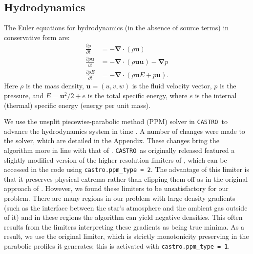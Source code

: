 \documentclass[iop]{../emulateapj}
\newcommand{\castro}{\texttt{CASTRO}}
\begin{document}
\subsection{Hydrodynamics}\label{sec:Hydrodynamics}

The Euler equations for hydrodynamics (in the absence of source terms) in conservative form are: 
\begin{align}
  \frac{\partial \rho}{\partial t} &= -\bm{\nabla} \cdot (\rho \mathbf{u}) \label{eq:euler_density}\\
  \frac{\partial \rho \mathbf{u}}{\partial t} &= -\bm{\nabla} \cdot (\rho \mathbf{u}\mathbf{u}) - \bm{\nabla}p \label{eq:euler_momentum}\\
  \frac{\partial \rho E}{\partial t} &= -\bm{\nabla}\cdot(\rho\mathbf{u}E + p\mathbf{u}). \label{eq:euler_energy}
\end{align}
Here $\rho$ is the mass density, $\mathbf{u} = (u, v, w)$ is the fluid velocity
vector, $p$ is the pressure, and $E = \mathbf{u}^2 / 2 + e$ is the
total specific energy, where $e$ is the internal (thermal) specific
energy (energy per unit mass).

We use the unsplit piecewise-parabolic method (PPM) solver in \castro\
to advance the hydrodynamics system in time \citep{ppmunsplit}.  A
number of changes were made to the solver, which are detailed in the
Appendix.  These changes bring the algorithm more in line with that of
\cite{ppm}. \castro\ as originally released featured a slightly modified
version of the higher resolution limiters of
\cite{colella_sekora:2008}, which can be accessed in the code using
\texttt{castro.ppm\_type = 2}. The advantage of this limiter is that
it preserves physical extrema rather than clipping them off as in the
original approach of \cite{ppm}. However, we found these limiters to
be unsatisfactory for our problem. There are many regions in our
problem with large density gradients (such as the interface between
the star's atmosphere and the ambient gas outside of it) and in these
regions the algorithm can yield negative densities. This often results
from the limiters interpreting these gradients as being true
minima. As a result, we use the original limiter, which is strictly
monotonicity preserving in the parabolic profiles it generates; this
is activated with \texttt{castro.ppm\_type = 1}.
\end{document}
